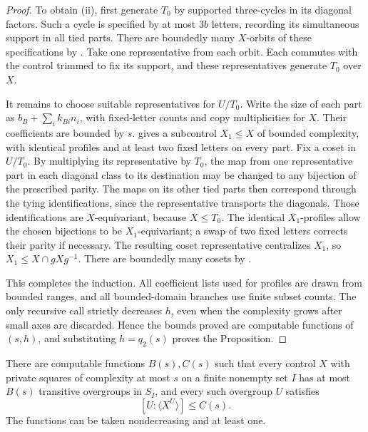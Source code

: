 \begin{proof}
To obtain (ii), first generate $T_0$ by supported three-cycles in
its diagonal factors.  Such a cycle is specified by at most $3b$
letters, recording its simultaneous support in all tied parts.
There are boundedly many $X$-orbits of these specifications by
.  Take one representative from each orbit.
Each commutes with the control trimmed to fix its support, and
these representatives generate $T_0$ over $X$.

It remains to choose suitable representatives for $U/T_0$.
Write the size of each part as
$b_B+\sum_i k_{Bi}n_i$, with fixed-letter counts and copy
multiplicities for $X$.  Their coefficients are bounded by $s$.
 gives a subcontrol $X_1\le X$ of bounded
complexity, with identical profiles and at least two fixed
letters on every part.  Fix a coset in $U/T_0$.  By multiplying
its representative by $T_0$, the map from one representative
part in each diagonal class to its destination may be changed
to any bijection of the prescribed parity.  The maps on its
other tied parts then correspond through the tying
identifications, since the representative transports the
diagonals.  Those identifications are $X$-equivariant, because
$X\le T_0$.  The identical $X_1$-profiles allow the chosen
bijections to be $X_1$-equivariant; a swap of two fixed letters
corrects their parity if necessary.  The resulting coset
representative centralizes $X_1$, so
$X_1\le X\cap gXg^{-1}$.  There are boundedly many cosets by
.

This completes the induction.  All coefficient lists used for
profiles are drawn from bounded ranges, and all bounded-domain
branches use finite subset counts.  The only recursive call
strictly decreases $h$, even when the complexity grows after
small axes are discarded.  Hence the bounds proved are computable
functions of $(s,h)$, and substituting $h=q_2(s)$ proves the
Proposition.
\end{proof}

\begin{proposition}
\label{n:private-squares}
There are computable functions $B(s),C(s)$ such that every control
$X$ with private squares of complexity at most $s$ on a finite
nonempty set $I$ has at most $B(s)$ transitive overgroups in $S_I$,
and every such overgroup $U$ satisfies
\[
 [U:\langle X^U\rangle]\le C(s).
\]
The functions can be taken nondecreasing and at least one.
\end{proposition}

